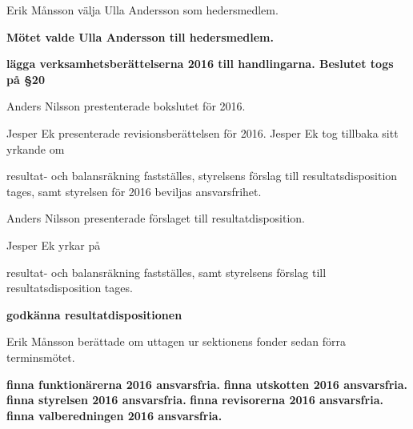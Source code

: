 \documentclass[10pt]{article}
\begin{document}
	\begin{paragrafer} \item[] %
	\begin{paragrafer}
    Erik Månsson \ypa välja Ulla Andersson som hedersmedlem.

    \textbf{Mötet valde Ulla Andersson till hedersmedlem.}
\end{paragrafer}
\textbf{\Mba lägga verksamhetsberättelserna 2016 till handlingarna. Beslutet togs på \S20}

Anders Nilsson prestenterade bokslutet för 2016.

Jesper Ek presenterade revisionsberättelsen för 2016.
Jesper Ek tog tillbaka sitt yrkande om
\begin{attsatser}
    \att resultat- och balansräkning fastställes,
    \att styrelsens förslag till resultatsdisposition tages, samt
    \att styrelsen för 2016 beviljas ansvarsfrihet.
\end{attsatser}

Anders Nilsson presenterade förslaget till resultatdisposition.

Jesper Ek yrkar på
\begin{attsatser}
    \att resultat- och balansräkning fastställes, samt
    \att styrelsens förslag till resultatsdisposition tages.
\end{attsatser}

\Mbaby

\textbf{\Mba godkänna resultatdispositionen}

Erik Månsson berättade om uttagen ur sektionens fonder sedan förra terminsmötet.

    \begin{paragrafer}
        \textbf{\Mba finna funktionärerna 2016 ansvarsfria.}
        \textbf{\Mba finna utskotten 2016 ansvarsfria.}
        \textbf{\Mba finna styrelsen 2016 ansvarsfria.}
        \textbf{\Mba finna revisorerna 2016 ansvarsfria.}
        \textbf{\Mba finna valberedningen 2016 ansvarsfria.}


\end{paragrafer}
\end{paragrafer}
\end{document}
